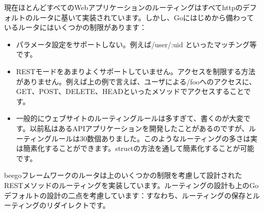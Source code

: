 現在ほとんどすべてのWebアプリケーションのルーティングはすべてhttpのデフォルトのルータに基いて実装されています。しかし、Goにはじめから備わっているルータにはいくつかの制限があります：

\begin{itemize}
  \item パラメータ設定をサポートしない。例えば/user/:uid といったマッチング等です。
  \item RESTモードをあまりよくサポートしていません。アクセスを制限する方法がありません。例えば上の例で言えば、ユーザによる/fooへのアクセスに、GET、POST、DELETE、HEADといったメソッドでアクセスすることです。
  \item 一般的にウェブサイトのルーティングルールは多すぎて、書くのが大変です。以前私はあるAPIアプリケーションを開発したことがあるのですが、ルーティングルールは30数個ありました。このようなルーティングの多さは実は簡素化することができます。structの方法を通して簡素化することが可能です。
\end{itemize}

beegoフレームワークのルータは上のいくつかの制限を考慮して設計されたRESTメソッドのルーティングを実装しています。ルーティングの設計も上のGoデフォルトの設計の二点を考慮しています：すなわち、ルーティングの保存とルーティングのリダイレクトです。
